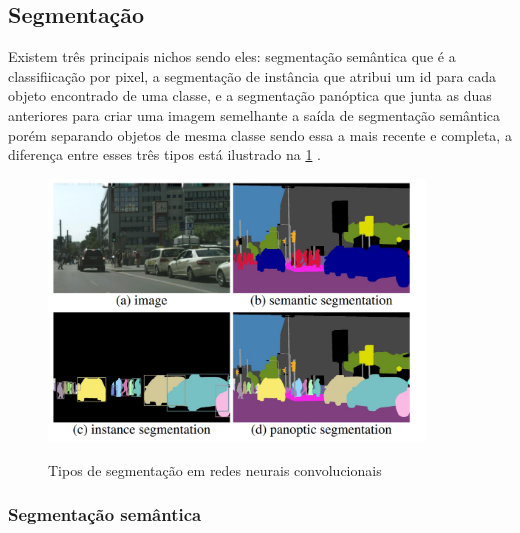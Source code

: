 \subsection{Segmentação}

Existem três principais nichos sendo eles: segmentação semântica que é a classifiicação por pixel, a segmentação de instância que atribui um id para cada objeto encontrado de uma classe, e a segmentação panóptica que junta as duas anteriores para criar uma imagem semelhante a saída de segmentação semântica porém separando objetos de mesma classe sendo essa a mais recente e completa, a diferença entre esses três tipos está ilustrado na \cref{fig:segentacoes} \cite{dp_semantic_segmantation, lapix}. 

\begin{figure}[H]
	\caption{Tipos de segmentação em redes neurais convolucionais}
	\centering %
	\includegraphics[width=10cm]{figures/segmantations.png} %
	\label{fig:segentacoes}
\end{figure}

\subsubsection*{Segmentação semântica}

